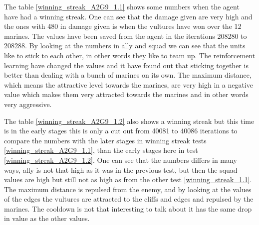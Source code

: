 
The table \ref{winning_streak_A2G9_1.1} shows some numbers when the agent have had a winning streak. One can see that the damage given are very high and the ones with 480 in damage given is when the vultures have won over the 12 marines. The values have been saved from the agent in the iterations 208280 to 208288. By looking at the numbers in ally and squad we can see that the units like to stick to each other, in other words they like to team up. The reinforcement learning have changed the values and it have found out that sticking together is better than dealing with a bunch of marines on its own. The maximum distance, which means the attractive level towards the marines, are very high in a negative value which makes them very attracted towards the marines and in other words very aggressive. 



The table \ref{winning_streak_A2G9_1.2} also shows a winning streak but this time is in the early stages this is only a cut out from 40081 to 40086 iterations to compare the numbers with the later stages in winning streak tests \ref{winning_streak_A2G9_1.1}, than the early stages here in test \ref{winning_streak_A2G9_1.2}. One can see that the numbers differs in many ways, ally is not that high as it was in the previous test, but then the squad values are high but still not as high as from the other test \ref{winning_streak_1.1}. The maximum distance is repulsed from the enemy, and by looking at the values of the edges the vultures are attracted to the cliffs and edges and repulsed by the marines. The cooldown is not that interesting to talk about it has the same drop in value as the other values.
